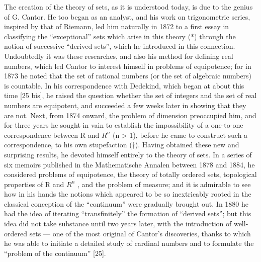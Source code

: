 The creation of the theory of sets, as it is understood today, is due to the genius of G. Cantor. He too began as an analyst, and his work on trigonometric series, inspired by that of Riemann, led him naturally in 1872 to a first essay in classifying the ``exceptional'' sets which arise in this theory (*) through the notion of successive ``derived sets'', which he introduced in this connection. Undoubtedly it was these researches, and also his method for defining real numbers, which led Cantor to interest himself in problems of equipotence; for in 1873 he noted that the set of rational numbers (or the set of algebraic numbers) is countable. In his correspondence with Dedekind, which began at about this time {[}25 bis{]}, he raised the question whether the set of integers and the set of real numbers are equipotent, and succeeded a few weeks later in showing that they are not. Next, from 1874 onward, the problem of dimension preoccupied him, and for three years he sought in vain to establish the impossibility of a one-to-one correspondence between R and \(R^{n}\) (n \textgreater{} 1), before he came to construct such a correspondence, to his own stupefaction (†). Having obtained these new and surprising results, he devoted himself entirely to the theory of sets. In a series of six memoirs published in the Mathematische Annalen between 1878 and 1884, he considered problems of equipotence, the theory of totally ordered sets, topological properties of R and \(R^{n}\) , and the problem of measure; and it is admirable to see how in his hands the notions which appeared to be so inextricably rooted in the classical conception of the ``continuum'' were gradually brought out. In 1880 he had the idea of iterating ``transfinitely'' the formation of ``derived sets''; but this idea did not take substance until two years later, with the introduction of well-ordered sets --- one of the most original of Cantor's discoveries, thanks to which he was able to initiate a detailed study of cardinal numbers and to formulate the ``problem of the continuum'' {[}25{]}.


